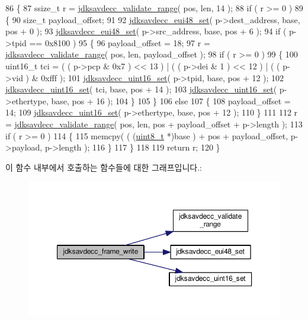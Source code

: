 \begin{DoxyCode}
86 \{
87     ssize\_t r = \hyperlink{group__util_ga9c02bdfe76c69163647c3196db7a73a1}{jdksavdecc\_validate\_range}( pos, len, 14 );
88     \textcolor{keywordflow}{if} ( r >= 0 )
89     \{
90         \textcolor{keywordtype}{size\_t} payload\_offset;
91 
92         \hyperlink{group__eui48_ga469d246a17ff1ee085030ee7dae57c5e}{jdksavdecc\_eui48\_set}( p->dest\_address, base, pos + 0 );
93         \hyperlink{group__eui48_ga469d246a17ff1ee085030ee7dae57c5e}{jdksavdecc\_eui48\_set}( p->src\_address, base, pos + 6 );
94         \textcolor{keywordflow}{if} ( p->tpid == 0x8100 )
95         \{
96             payload\_offset = 18;
97             r = \hyperlink{group__util_ga9c02bdfe76c69163647c3196db7a73a1}{jdksavdecc\_validate\_range}( pos, len, payload\_offset );
98             \textcolor{keywordflow}{if} ( r >= 0 )
99             \{
100                 uint16\_t tci = ( ( p->pcp & 0x7 ) << 13 ) | ( ( p->dei & 1 ) << 12 ) | ( ( p->vid ) & 0xfff
       );
101                 \hyperlink{group__endian_ga14b9eeadc05f94334096c127c955a60b}{jdksavdecc\_uint16\_set}( p->tpid, base, pos + 12 );
102                 \hyperlink{group__endian_ga14b9eeadc05f94334096c127c955a60b}{jdksavdecc\_uint16\_set}( tci, base, pos + 14 );
103                 \hyperlink{group__endian_ga14b9eeadc05f94334096c127c955a60b}{jdksavdecc\_uint16\_set}( p->ethertype, base, pos + 16 );
104             \}
105         \}
106         \textcolor{keywordflow}{else}
107         \{
108             payload\_offset = 14;
109             \hyperlink{group__endian_ga14b9eeadc05f94334096c127c955a60b}{jdksavdecc\_uint16\_set}( p->ethertype, base, pos + 12 );
110         \}
111 
112         r = \hyperlink{group__util_ga9c02bdfe76c69163647c3196db7a73a1}{jdksavdecc\_validate\_range}( pos, len, pos + payload\_offset + p->length 
      );
113         \textcolor{keywordflow}{if} ( r >= 0 )
114         \{
115             memcpy( ( (\hyperlink{stdint_8h_aba7bc1797add20fe3efdf37ced1182c5}{uint8\_t} *)base ) + pos + payload\_offset, p->payload, p->length );
116         \}
117     \}
118 
119     \textcolor{keywordflow}{return} r;
120 \}
\end{DoxyCode}


이 함수 내부에서 호출하는 함수들에 대한 그래프입니다.\+:
\nopagebreak
\begin{figure}[H]
\begin{center}
\leavevmode
\includegraphics[width=350pt]{group__frame_gaba1e860c060886e82198907b17214aee_cgraph}
\end{center}
\end{figure}




